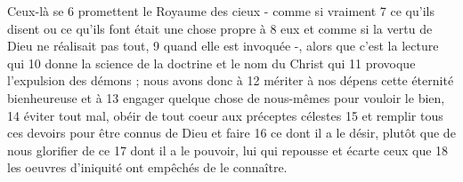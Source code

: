 
Ceux-là se	 
6	 	promettent le Royaume des cieux - comme si vraiment	 
7	 	ce qu'ils disent ou ce qu'ils font était une chose propre à	 
8	 	eux et comme si la vertu de Dieu ne réalisait pas tout,	 
9	 	quand elle est invoquée -, alors que c'est la lecture qui	 
10	 	donne la science de la doctrine et le nom du Christ qui	 
11	 	provoque l'expulsion des démons ; nous avons donc à	 
12	 	mériter à nos dépens cette éternité bienheureuse et à	 
13	 	engager quelque chose de nous-mêmes pour vouloir le bien,	 
14	 	éviter tout mal, obéir de tout coeur aux préceptes célestes	 
15	 	et remplir tous ces devoirs pour être connus de Dieu et faire	 
16	 	ce dont il a le désir, plutôt que de nous glorifier de ce	 
17	 	dont il a le pouvoir, lui qui repousse et écarte ceux que	 
18	 	les oeuvres d'iniquité ont empêchés de le connaître.